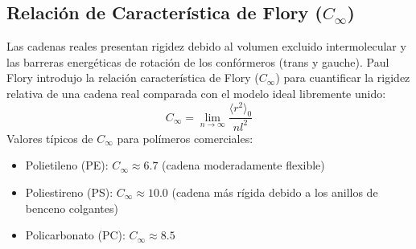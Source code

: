 \subsection{Relación de Característica de Flory ($C_\infty$)}
Las cadenas reales presentan rigidez debido al volumen excluido intermolecular y las barreras energéticas de rotación de los confórmeros (trans y gauche). Paul Flory introdujo la relación característica de Flory ($C_\infty$) para cuantificar la rigidez relativa de una cadena real comparada con el modelo ideal libremente unido:
\begin{equation}
    C_\infty = \lim_{n \to \infty} \frac{\langle r^2 \rangle_0}{n l^2}
    \label{eq:flory_ratio}
\end{equation}
Valores típicos de $C_\infty$ para polímeros comerciales:
\begin{itemize}
    \item Polietileno (PE): $C_\infty \approx 6.7$ (cadena moderadamente flexible)
    \item Poliestireno (PS): $C_\infty \approx 10.0$ (cadena más rígida debido a los anillos de benceno colgantes)
    \item Policarbonato (PC): $C_\infty \approx 8.5$
\end{itemize}
